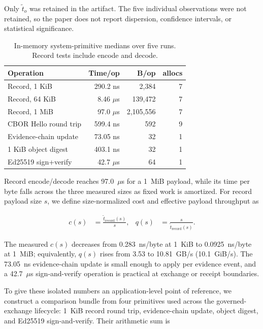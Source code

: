 \documentclass[10pt]{article}
\begin{document}
Only $\widetilde{t}_o$ was retained in the artifact. The five individual observations were not retained, so the paper does not report dispersion, confidence intervals, or statistical significance.

\begin{table}[t]
\centering
\caption{In-memory system-primitive medians over five runs. Record tests include encode and decode.}
\label{tab:microbench}
\small
\begin{tabular}{@{}l r r r@{}}
\toprule
Operation & Time/op & B/op & allocs \\
\midrule
Record, 1 KiB & 290.2 ns & 2,384 & 7 \\
Record, 64 KiB & 8.46 $\mu$s & 139,472 & 7 \\
Record, 1 MiB & 97.0 $\mu$s & 2,105,556 & 7 \\
CBOR Hello round trip & 599.4 ns & 592 & 9 \\
Evidence-chain update & 73.05 ns & 32 & 1 \\
1 KiB object digest & 403.1 ns & 32 & 1 \\
Ed25519 sign+verify & 42.7 $\mu$s & 64 & 1 \\
\bottomrule
\end{tabular}
\end{table}

Record encode/decode reaches 97.0~$\mu$s for a 1~MiB payload, while its time per byte falls across the three measured sizes as fixed work is amortized. For record payload size $s$, we define size-normalized cost and effective payload throughput as

\begin{align}
c(s) &= \frac{\widetilde{t}_{\mathrm{record}}(s)}{s},
  & q(s) &= \frac{s}{\widetilde{t}_{\mathrm{record}}(s)}.
\label{eq:normalized}
\end{align}

The measured $c(s)$ decreases from 0.283~ns/byte at 1~KiB to 0.0925~ns/byte at 1~MiB; equivalently, $q(s)$ rises from 3.53 to 10.81~GB/s (10.1~GiB/s). The 73.05~ns evidence-chain update is small enough to apply per evidence event, and a 42.7~$\mu$s sign-and-verify operation is practical at exchange or receipt boundaries.

To give these isolated numbers an application-level point of reference, we construct a comparison bundle from four primitives used across the governed-exchange lifecycle: 1~KiB record round trip, evidence-chain update, object digest, and Ed25519 sign-and-verify. Their arithmetic sum is
\end{document}

